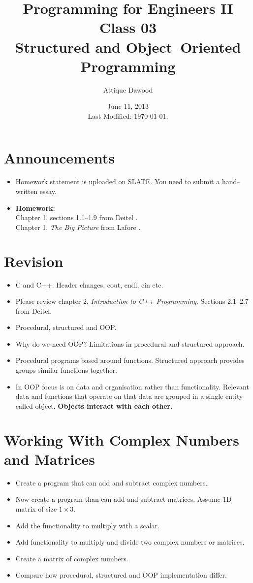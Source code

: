 \documentclass[12pt,a4paper]{article}
\title{\vspace{-2cm}Programming for Engineers II\\Class 03\\Structured and Object--Oriented Programming}
\author{Attique Dawood}
\date{June 11, 2013\\[0.2cm] Last Modified: \today, \currenttime}
\begin{document}
\maketitle
\section{Announcements}
\begin{itemize}
\item Homework statement is uploaded on SLATE. You need to submit a hand--written essay.
\item \textbf{Homework:}\\
Chapter 1, sections 1.1--1.9 from Deitel \cite{Deitel}.\\
Chapter 1, \textit{The Big Picture} from Lafore \cite{Lafore}.\\
\end{itemize}
\section{Revision}
\begin{itemize}
\item C and C++. Header changes, cout, endl, cin etc.
\item Please review chapter 2, \textit{Introduction to C++ Programming}. Sections 2.1--2.7 from Deitel.
\item Procedural, structured and OOP.
\item Why do we need OOP? Limitations in procedural and structured approach.
\item Procedural programs based around functions. Structured approach provides groups similar functions together.
\item In OOP focus is on data and organisation rather than functionality. Relevant data and functions that operate on that data are grouped in a single entity called object. \textbf{Objects interact with each other.}
\end{itemize}
\section{Working With Complex Numbers and Matrices}
\begin{itemize}
\item Create a program that can add and subtract complex numbers.
\item Now create a program than can add and subtract matrices. Assume 1D matrix of size $1\times 3$.
\item Add the functionality to multiply with a scalar.
\item Add functionality to multiply and divide two complex numbers or matrices.
\item Create a matrix of complex numbers.
\item Compare how procedural, structured and OOP implementation differ.
\end{itemize}
\end{document}
